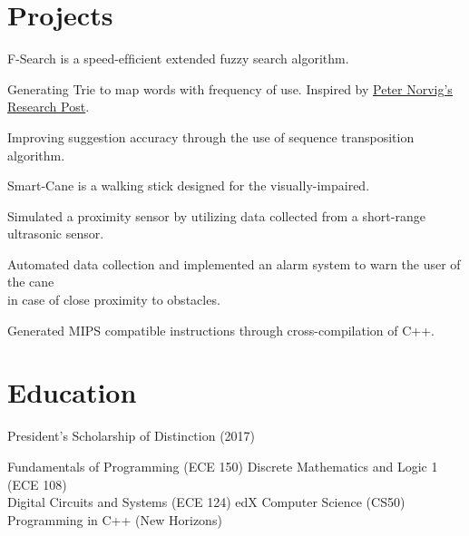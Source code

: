 \documentclass[]{deedy-resume-openfont}
\begin{document}
\section{Projects}

\begin{tightemize}
\item F-Search is a speed-efﬁcient extended fuzzy search algorithm.
\item Generating Trie to map words with frequency of use. Inspired by \href{http://norvig.com/mayzner.html}{\underline{Peter Norvig's Research Post}}.
\item Improving suggestion accuracy through the use of sequence transposition algorithm.
\end{tightemize}
\sectionsep

\begin{tightemize}
\item Smart-Cane is a walking stick designed for the visually-impaired. 
\item Simulated a proximity sensor by utilizing data collected from a short-range ultrasonic sensor. 
\item Automated data collection and implemented an alarm system to warn the user of the cane \\ in case of close proximity to obstacles.
\item Generated MIPS compatible instructions through cross-compilation of C++.
\end{tightemize}
\sectionsep

\section{Education}
\begin{tightemize}
\item President’s Scholarship of Distinction (2017)
\end{tightemize}
\sectionsep

\descript{\color{gray}{Relevant Coursework}}
\sectionsep
\textbullet{} Fundamentals of Programming (ECE 150) \textbullet{}   Discrete Mathematics and Logic 1 (ECE 108) \\
\textbullet{} Digital Circuits and Systems (ECE 124) \textbullet{} edX Computer Science (CS50) \\ \textbullet{} Programming in C++ (New Horizons)
\sectionsep
\end{document}
